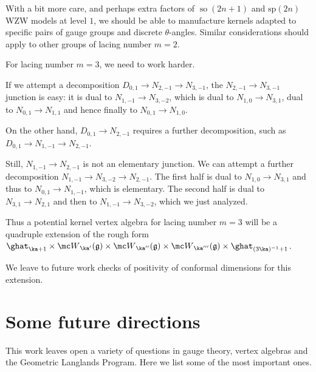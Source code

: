 \documentclass[11pt,reqno]{amsart}
\theoremstyle{plain}
\numberwithin{equation}{section}
\newcommand{\g}{\mathfrak{g}}
\DeclareMathOperator{\tso}{so}
\theoremstyle{definition}
\begin{document}
With a bit more care, and perhaps extra factors of $\tso(2n+1)$ and
$\mathrm{sp}(2n)$ WZW models at level $1$, we should be able to
manufacture kernels adapted to specific pairs of gauge groups and
discrete $\theta$-angles. Similar considerations should apply to other
groups of lacing number $m=2$.

\bigskip

For lacing number $m=3$, we need to work harder. 

If we attempt a decomposition $D_{0,1} \to N_{2,-1} \to N_{3,-1}$, the
$N_{2,-1} \to N_{3,-1}$ junction is easy: it is dual to $N_{1,-1} \to
N_{3,-2}$, which is dual to $N_{1,0} \to N_{3,1}$, dual to $N_{0,1}
\to N_{1,1}$ and hence finally to $N_{0,1} \to N_{1,0}$.

On the other hand, $D_{0,1} \to N_{2,-1}$ requires a further
decomposition, such as $D_{0,1} \to N_{1,-1} \to N_{2,-1}$. 

Still, $N_{1,-1} \to N_{2,-1}$ is not an elementary junction. 
We can attempt a further decomposition $N_{1,-1} \to N_{3,-2}\to N_{2,-1}$.
The first half is dual to $N_{1,0} \to N_{3,1}$ and thus to $N_{0,1} \to N_{1,-1}$,
which is elementary. The second half is dual to $N_{3,1}\to N_{2,1}$
and then to $N_{1,-1} \to N_{3,-2}$, which we just analyzed. 

Thus a potential kernel vertex algebra for lacing number $m=3$ will be a
quadruple extension of the rough form $\ghat_{\ka+1} \times {\mc
  W}_{\ka'}(\g) \times {\mc W}_{\ka''}(\g) \times {\mc W}_{\ka'''}(\g) \times
\ghat_{(3\ka)^{-1}+1}$.

We leave to future work checks of positivity of conformal dimensions
for this extension.

\section{Some future directions}    \label{future}

This work leaves open a variety of questions in gauge theory, vertex
algebras and the Geometric Langlands Program.  Here we list some of
the most important ones.

\medskip
\end{document}
